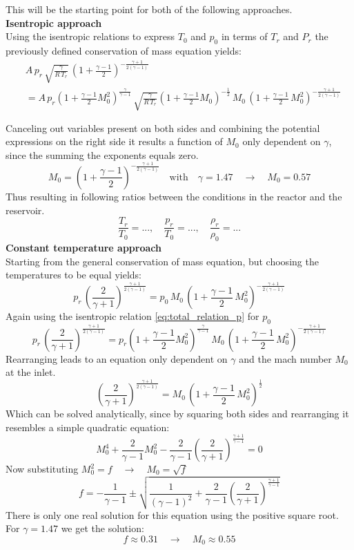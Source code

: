 This will be the starting point for both of the following approaches.\\
\textbf{Isentropic approach}\\
Using the isentropic relations to express $T_0$ and $p_0$ in terms of $T_r$ and $P_r$ the previously defined conservation of mass equation yields:
\begin{align*}
	&A\, p_r\, \sqrt{\frac{\gamma}{R\,T_r}}\,\left(1+\frac{\gamma-1}{2}\right)^{-\frac{\gamma+1}{2(\gamma-1)}}\\
	&= A\, p_r\left(1 + \frac{\gamma - 1}{2}M_0^2\right)^{\frac{\gamma}{\gamma-1}}\, \sqrt{\frac{\gamma}{R\,T_r}}\left(1 + \frac{\gamma - 1}{2}M_0\right)^{-\frac{1}{2}}\, M_0\,\left(1+\frac{\gamma-1}{2}\,M_0^2\right)^{-\frac{\gamma+1}{2(\gamma-1)}}\\\\
\end{align*}
Canceling out variables present on both sides and combining the potential expressions on the right side it results a function of $M_0$ only dependent on $\gamma$, since the summing the exponents equals zero.
$$
	M_0 = (1 + \frac{\gamma - 1}{2})^{-\frac{\gamma + 1}{2(\gamma - 1)}}
	\quad \text{with} \quad \gamma = 1.47 \quad \to \quad
	M_0 = 0.57
$$
Thus resulting in following ratios between the conditions in the reactor and the reservoir.
$$
	\frac{T_r}{T_0} = ... , \quad \frac{p_r}{T_0} = ... , \quad \frac{\rho_r}{\rho_0} = ...
$$
\textbf{Constant temperature approach}\\
Starting from the general conservation of mass equation, but choosing the temperatures to be equal yields:
$$
	p_r\, \left(\frac{2}{\gamma+1}\right)^{\frac{\gamma+1}{2(\gamma-1)}}
	=  p_0\, M_0\,\left(1+\frac{\gamma-1}{2}\,M_0^2\right)^{-\frac{\gamma+1}{2(\gamma-1)}}
$$
Again using the isentropic relation \eqref{eq:total_relation_p} for $p_0$
$$
	p_r\, \left(\frac{2}{\gamma+1}\right)^{\frac{\gamma+1}{2(\gamma-1)}}
	=  p_r \left(1 + \frac{\gamma - 1}{2}M_0^2 \right)^{\frac{\gamma}{\gamma - 1}}\, M_0\,\left(1+\frac{\gamma-1}{2}\,M_0^2\right)^{-\frac{\gamma+1}{2(\gamma-1)}}
$$
Rearranging leads to an equation only dependent on $\gamma$ and the mach number $M_0$ at the inlet.
$$
	\left(\frac{2}{\gamma+1}\right)^{\frac{\gamma+1}{2(\gamma-1)}}
	=  M_0\,\left(1+\frac{\gamma-1}{2}\,M_0^2\right)^{\frac{1}{2}}
$$
Which can be solved analytically, since by squaring both sides and rearranging it resembles a simple quadratic equation:
$$
	M_0^4 + \frac{2}{\gamma - 1}M_0^2 - \frac{2}{\gamma -1}\left(\frac{2}{\gamma + 1}\right)^{\frac{\gamma + 1}{\gamma - 1}} = 0
$$
Now substituting $M_0^2 = f \quad \to \quad M_0 = \sqrt{f}$
$$
	f = -\frac{1}{\gamma - 1} \pm \sqrt{\frac{1}{(\gamma - 1)^2}
	+ \frac{2}{\gamma -1}\left(\frac{2}{\gamma + 1}\right)^{\frac{\gamma + 1}{\gamma - 1}}}
$$
There is only one real solution for this equation using the positive square root.
For $\gamma = 1.47$ we get the solution:
$$
	f \approx 0.31 \quad \to \quad M_0 \approx 0.55
$$

